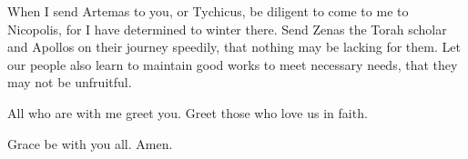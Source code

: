 \myverse{}When I send Artemas to you, or Tychicus, be diligent to come
to me to Nicopolis, for I have determined to winter there.
\myverse{}Send Zenas the Torah scholar and Apollos on their journey speedily, that nothing
may be lacking for them.
\myverse{}Let our people also learn to maintain good works to meet necessary needs,
that they may not be unfruitful.

\myverse{}All who are with me greet you. Greet those who love us in faith.

Grace be with you all. Amen.


